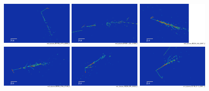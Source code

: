 \begin{figure}
    \includegraphics[width=0.32\textwidth]{Sidebands/Figures/nuecc/evd/1e1p_b.png}
    \includegraphics[width=0.32\textwidth]{Sidebands/Figures/nuecc/evd/1e2p_a.png}
    \includegraphics[width=0.32\textwidth]{Sidebands/Figures/nuecc/evd/1e2p_b.png} \\
    
    \includegraphics[width=0.32\textwidth]{Sidebands/Figures/nuecc/evd/1e3p_b.png}
    \includegraphics[width=0.32\textwidth]{Sidebands/Figures/nuecc/evd/1e3p_a.png}
    \includegraphics[width=0.32\textwidth]{Sidebands/Figures/nuecc/evd/1e1x.png} \\
    

\end{figure}
